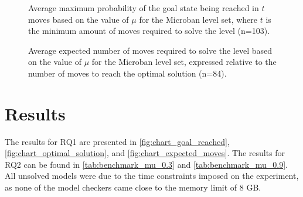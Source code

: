 \begin{figure}[h]
    \centering
    \caption{Average maximum probability of the goal state being reached in $t$ moves based on the value of $\mu$ for the Microban level set, where $t$ is the minimum amount of moves required to solve the level (n=103).}
    \label{fig:chart_optimal_solution}
\end{figure}

\begin{figure}[h]
    \centering
    \caption{Average expected number of moves required to solve the level based on the value of $\mu$ for the Microban level set, expressed relative to the number of moves to reach the optimal solution (n=84).}
    \label{fig:chart_expected_moves}
\end{figure}

\section{Results}

The results for RQ1 are presented in \autoref{fig:chart_goal_reached}, \autoref{fig:chart_optimal_solution}, and \autoref{fig:chart_expected_moves}. The results for RQ2 can be found in \autoref{tab:benchmark_mu_0.3} and \autoref{tab:benchmark_mu_0.9}. All unsolved models were due to the time constraints imposed on the experiment, as none of the model checkers came close to the memory limit of 8 GB.

